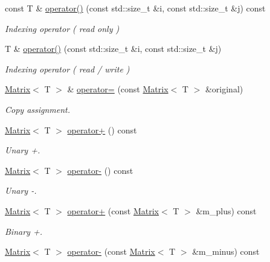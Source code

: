 \begin{DoxyCompactItemize}
const T \& \hyperlink{classLuna_1_1Matrix_ac451a0b396f3382e0b16ad3e95208960}{operator()} (const std\+::size\+\_\+t \&i, const std\+::size\+\_\+t \&j) const
\begin{DoxyCompactList}\small\item\em Indexing operator ( read only ) \end{DoxyCompactList}\item 
T \& \hyperlink{classLuna_1_1Matrix_a8b3b21c2f3a16c313e6fcd2ca1def654}{operator()} (const std\+::size\+\_\+t \&i, const std\+::size\+\_\+t \&j)
\begin{DoxyCompactList}\small\item\em Indexing operator ( read / write ) \end{DoxyCompactList}\item 
\hyperlink{classLuna_1_1Matrix}{Matrix}$<$ T $>$ \& \hyperlink{classLuna_1_1Matrix_a80e1ec59594b0fd5ede4d7f53aa9aa7c}{operator=} (const \hyperlink{classLuna_1_1Matrix}{Matrix}$<$ T $>$ \&original)
\begin{DoxyCompactList}\small\item\em Copy assignment. \end{DoxyCompactList}\item 
\hyperlink{classLuna_1_1Matrix}{Matrix}$<$ T $>$ \hyperlink{classLuna_1_1Matrix_a0da8678a18ee0d774b6e52ea913fcda3}{operator+} () const
\begin{DoxyCompactList}\small\item\em Unary +. \end{DoxyCompactList}\item 
\hyperlink{classLuna_1_1Matrix}{Matrix}$<$ T $>$ \hyperlink{classLuna_1_1Matrix_a9308b5c350baf8544a0fc53533e734c8}{operator-\/} () const
\begin{DoxyCompactList}\small\item\em Unary -\/. \end{DoxyCompactList}\item 
\hyperlink{classLuna_1_1Matrix}{Matrix}$<$ T $>$ \hyperlink{classLuna_1_1Matrix_ac14dcb908c213e7b871191d9a97db649}{operator+} (const \hyperlink{classLuna_1_1Matrix}{Matrix}$<$ T $>$ \&m\+\_\+plus) const
\begin{DoxyCompactList}\small\item\em Binary +. \end{DoxyCompactList}\item 
\hyperlink{classLuna_1_1Matrix}{Matrix}$<$ T $>$ \hyperlink{classLuna_1_1Matrix_a5b55b33cc912e66b6c1128cff82e2d07}{operator-\/} (const \hyperlink{classLuna_1_1Matrix}{Matrix}$<$ T $>$ \&m\+\_\+minus) const

\end{DoxyCompactItemize}
